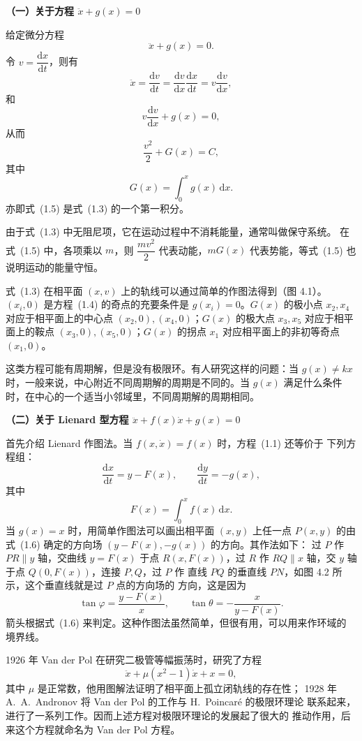 \noindent\textbf{（一）关于方程 $\ddot{x}+g(x)=0$}

给定微分方程
\[
  \ddot{x}+g(x)=0. \tag{1.3}
\]
令 $v=\dfrac{\mathrm{d}x}{\mathrm{d}t}$，则有
\[
  \ddot{x}=\dfrac{\mathrm{d}v}{\mathrm{d}t}
  =\dfrac{\mathrm{d}v}{\mathrm{d}x}\dfrac{\mathrm{d}x}{\mathrm{d}t}
  =v\dfrac{\mathrm{d}v}{\mathrm{d}x},
\]
和
\[
  v\dfrac{\mathrm{d}v}{\mathrm{d}x}+g(x)=0, \tag{1.4}
\]
从而
\[
  \dfrac{v^2}{2}+G(x)=C, \tag{1.5}
\]
其中
\[
  G(x)=\int_0^xg(x)\,\mathrm{d}x.
\]
亦即式~(1.5) 是式~(1.3) 的一个第一积分。

由于式~(1.3) 中无阻尼项，它在运动过程中不消耗能量，通常叫做保守系统。
在式~(1.5) 中，各项乘以 $m$，则 $\dfrac{mv^2}{2}$ 代表动能，$mG(x)$
代表势能，等式~(1.5) 也说明运动的能量守恒。

式~(1.3) 在相平面 $(x,v)$ 上的轨线可以通过简单的作图法得到（图 4.1）。
$(x_i,0)$ 是方程~(1.4) 的奇点的充要条件是 $g(x_i)=0$。$G(x)$ 的极小点
$x_2,x_4$ 对应于相平面上的中心点 $(x_2,0),(x_4,0)$；$G(x)$ 的极大点
$x_3,x_5$ 对应于相平面上的鞍点 $(x_3,0),(x_5,0)$；$G(x)$ 的拐点 $x_1$
对应相平面上的非初等奇点 $(x_1,0)$。

这类方程可能有周期解，但是没有极限环。有人研究这样的问题：当
$g(x)\ne kx$ 时，一般来说，中心附近不同周期解的周期是不同的。当 $g(x)$
满足什么条件时，在中心的一个适当小邻域里，不同周期解的周期相同。


\noindent\textbf{（二）关于 Lienard 型方程
$\ddot{x}+f(x)\dot{x}+g(x)=0$}

首先介绍 Lienard 作图法。当 $f(x,\dot{x})=f(x)$ 时，方程~(1.1) 还等价于
下列方程组：
\[
  \dfrac{\mathrm{d}x}{\mathrm{d}t}=y-F(x),\qquad
  \dfrac{\mathrm{d}y}{\mathrm{d}t}=-g(x), \tag{1.6}
\]
其中
\[
  F(x)=\int_0^xf(x)\,\mathrm{d}x.
\]
当 $g(x)=x$ 时，用简单作图法可以画出相平面 $(x,y)$ 上任一点
$P(x,y)$ 的由式~(1.6) 确定的方向场 $(y-F(x),-g(x))$ 的方向。其作法如下：
过 $P$ 作 $PR\parallel y$ 轴，交曲线 $y=F(x)$ 于点 $R(x,F(x))$，过 $R$
作 $RQ\parallel x$ 轴，交 $y$ 轴于点 $Q(0,F(x))$，连接 $P,Q$，过 $P$ 作
直线 $PQ$ 的垂直线 $PN$，如图 4.2 所示，这个垂直线就是过 $P$ 点的方向场的
方向，这是因为
\[
  \tan\varphi=\dfrac{y-F(x)}{x},\qquad
  \tan\theta=-\dfrac{x}{y-F(x)}.
\]
箭头根据式~(1.6) 来判定。这种作图法虽然简单，但很有用，可以用来作环域的
境界线。


1926 年 Van der Pol 在研究二极管等幅振荡时，研究了方程
\[
  \ddot{x}+\mu(x^2-1)\dot{x}+x=0,
\]
其中 $\mu$ 是正常数，他用图解法证明了相平面上孤立闭轨线的存在性；
1928 年 A.~A.~Andronov 将 Van der Pol 的工作与 H.~Poincar\'e 的极限环理论
联系起来，进行了一系列工作。因而上述方程对极限环理论的发展起了很大的
推动作用，后来这个方程就命名为 Van der Pol 方程。

